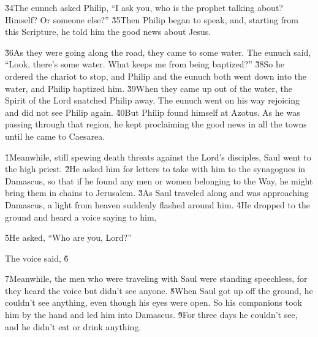 \v{34}The eunuch asked Philip, ``I ask you, who is the prophet talking about? Himself? Or someone else?'' \v{35}Then Philip began to speak, and, starting from this Scripture, he told him the good news about Jesus.

\v{36}As they were going along the road, they came to some water. The eunuch said, ``Look, there's some water. What keeps me from being baptized?'' \v{38}So he ordered the chariot to stop, and Philip and the eunuch both went down into the water, and Philip baptized him. \v{39}When they came up out of the water, the Spirit of the Lord snatched Philip away. The eunuch went on his way rejoicing and did not see Philip again. \v{40}But Philip found himself at Azotus. As he was passing through that region, he kept proclaiming the good news in all the towns until he came to Caesarea.

\v{1}Meanwhile, still spewing death threats against the Lord's disciples, Saul went to the high priest. \v{2}He asked him for letters to take with him to the synagogues in Damascus, so that if he found any men or women belonging to the Way, he might bring them in chains to Jerusalem. \v{3}As Saul traveled along and was approaching Damascus, a light from heaven suddenly flashed around him. \v{4}He dropped to the ground and heard a voice saying to him, 

\v{5}He asked, ``Who are you, Lord?''

The voice said,  \v{6}

\v{7}Meanwhile, the men who were traveling with Saul were standing speechless, for they heard the voice but didn't see anyone. \v{8}When Saul got up off the ground, he couldn't see anything, even though his eyes were open. So his companions took him by the hand and led him into Damascus. \v{9}For three days he couldn't see, and he didn't eat or drink anything.

